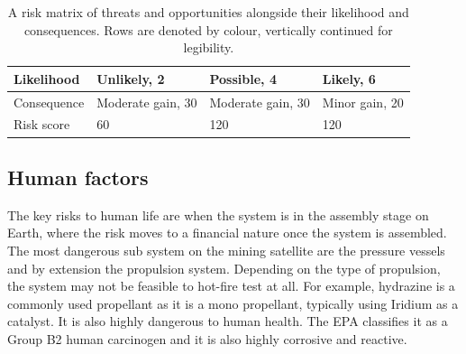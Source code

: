 \documentclass[conference]{IEEEtran}
\begin{document}
\begin{table}[H]
{\begin{tabular}{|l|l|l|l|}
\rowcolor[HTML]{FFCE93} 
Likelihood               & Unlikely, 2                                                                                                  & Possible, 4                                                                                        & Likely, 6                                                                                            \\ \hline
\rowcolor[HTML]{9AFF99} 
Consequence              & Moderate gain, 30                                                                                            & Moderate gain, 30                                                                                  & Minor gain, 20                                                                                       \\ \hline
\rowcolor[HTML]{CBCEFB} 
Risk score               & 60                                                                                                           & 120                                                                                                & 120                                                                                                  \\ \hline
\end{tabular}%
}
\caption{A risk matrix of threats and opportunities alongside their likelihood and consequences. Rows are denoted by colour, vertically continued for legibility.}
\label{tab:pestle}
\end{table}

\subsection{Human factors}
The key risks to human life are when the system is in the assembly stage on Earth, where the risk moves to a financial nature once the system is assembled. The most dangerous sub system on the mining satellite are the pressure vessels and by extension the propulsion system. Depending on the type of propulsion, the system may not be feasible to hot-fire test at all. For example, hydrazine is a commonly used propellant as it is a mono propellant, typically using Iridium as a catalyst. It is also highly  dangerous to human health. The EPA classifies it as a Group B2 human carcinogen and it is also highly corrosive and reactive.
\end{document}
